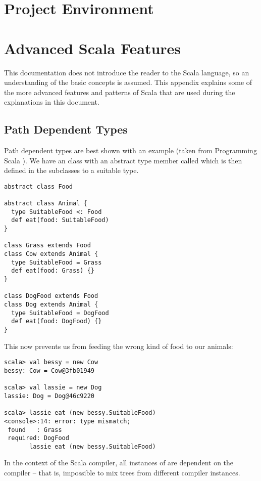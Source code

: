\chapter{Project Environment} \label{chapter:project-environment}

\chapter{Advanced Scala Features} \label{chapter:advanced-scala-features}

This documentation does not introduce the reader to the Scala language, so an understanding of the basic concepts is assumed. This appendix explains some of the more advanced features and patterns of Scala that are used during the explanations in this document.

\section{Path Dependent Types} \label{section:path-dependent-types}

Path dependent types are best shown with an example (taken from Programming Scala \cite{ProgrammingScala}). We have an  class with an abstract type member called  which is then defined in the subclasses to a suitable type.
\begin{lstlisting}
abstract class Food

abstract class Animal {
  type SuitableFood <: Food
  def eat(food: SuitableFood)
}

class Grass extends Food
class Cow extends Animal {
  type SuitableFood = Grass
  def eat(food: Grass) {}
}

class DogFood extends Food
class Dog extends Animal {
  type SuitableFood = DogFood
  def eat(food: DogFood) {}
}
\end{lstlisting}

This now prevents us from feeding the wrong kind of food to our animals:

\begin{lstlisting}
scala> val bessy = new Cow
bessy: Cow = Cow@3fb01949

scala> val lassie = new Dog
lassie: Dog = Dog@46c9220

scala> lassie eat (new bessy.SuitableFood)
<console>:14: error: type mismatch;
 found   : Grass
 required: DogFood
       lassie eat (new bessy.SuitableFood)
\end{lstlisting}

In the context of the Scala compiler, all instances of  are dependent on the compiler -- that is, impossible to mix trees from different compiler instances.

